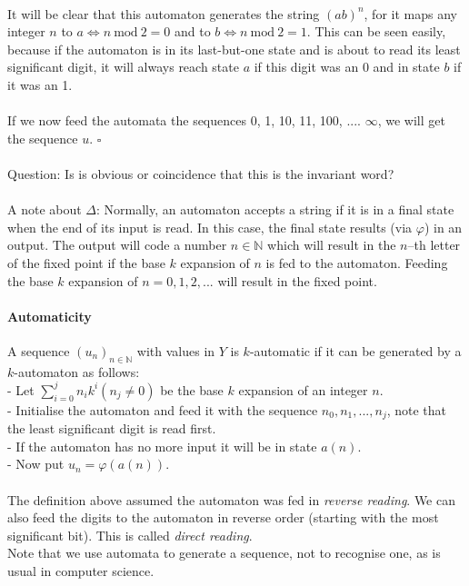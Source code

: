 \documentclass{article}
\begin{document}
\\
It will be clear that this automaton generates the string $(ab)^n$, for it
maps any integer $n$ to $a \Leftrightarrow n \mathrm{\ mod\ } 2 = 0$ and to
$b \Leftrightarrow n \mathrm{\ mod\ } 2 = 1$. This can be seen easily,
because if the automaton is in its last-but-one state and is about to read its
least significant digit, it will always reach state $a$ if this digit was an 0
and in state $b$ if it was an 1.\\
\\
If we now feed the automata the sequences 0, 1, 10, 11, 100, .... $\infty$,
we will get the sequence $u$. $\square$\\
\\
Question: Is is obvious or coincidence that this is the invariant word?\\
\\
A note about $\Delta$: Normally, an automaton accepts a string if it is in
a final state when the end of its input is read. In this case, the final state
results (via $\varphi$) in an output. The output will code a number
$n \in \mathbb{N}$ which will result in the $n$--th letter of the fixed point
if the base $k$ expansion of $n$ is fed to the automaton. Feeding the base
$k$ expansion of $n = 0, 1, 2, ...$ will result in the fixed point.

\paragraph{Automaticity} A sequence $(u_n)_{n \in \mathbb{N}}$ with values in
$Y$ is $k$-automatic if it can be generated by a $k$-automaton as follows:\\
- Let $\sum_{i=0}^j n_i k^i (n_j \neq 0)$ be the base $k$ expansion of an
  integer $n$.\\
- Initialise the automaton and feed it with the sequence $n_0, n_1, ..., n_j$,
  note that the least significant digit is read first.\\
- If the automaton has no more input it will be in state $a(n)$.\\
- Now put $u_n = \varphi(a(n))$.\\
\\
The definition above assumed the automaton was fed in \emph{reverse reading}.
We can also feed the digits to the automaton in reverse order (starting with
the most significant bit). This is called \emph{direct reading}.\\
Note that we use automata to generate a sequence, not to recognise one, as is
usual in computer science.
\end{document}
